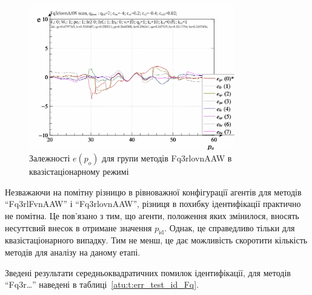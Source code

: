 \begin{figure}[htb!]
  \begin{center}
    \includegraphics[width=0.8\textwidth]{p/scan/qls-p_p_e_Fq3rlovnAAW_scan.png}
  \end{center}
  \caption{Залежності $e(p_o)$ для групи методів Fq3rlovnAAW в квазістаціонарному режимі}
  \label{atu:f:Fq3rlovnAAW_scan}
\end{figure}

Незважаючи на помітну різницю в рівноважної конфігурації
агентів для методів ``Fq3rlFvnAAW'' і ``Fq3rlovnAAW'', різниця в похибку
ідентифікації практично не помітна. Це пов'язано з тим, що агенти,
положення яких змінилося, вносять несуттєвий внесок в отримане
значення
$ p_\mathrm{id} $. Однак, це справедливо тільки для квазістаціонарного
випадку. Тим не менш, це дає можливість скоротити кількість
методів для аналізу на даному етапі.

Зведені результати середньоквадратичних помилок ідентифікації,
для методів ``Fq3r\ldots'' наведені в таблиці~\ref{atu:t:err_test_id_Fq}.

